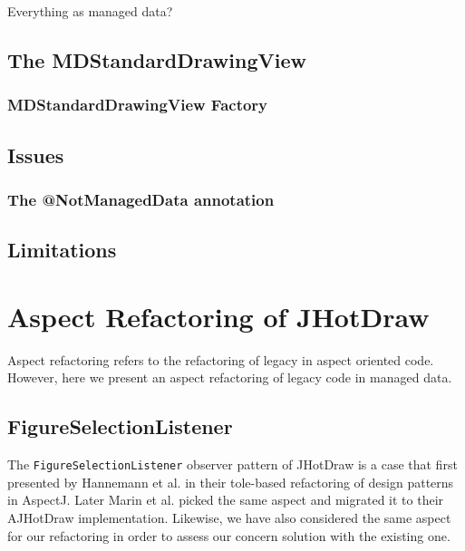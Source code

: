 Everything as managed data?

\subsection{The MDStandardDrawingView}

\subsubsection{MDStandardDrawingView Factory}

\subsection{Issues}
\subsubsection{The @NotManagedData annotation}

\subsection{Limitations}

\section{Aspect Refactoring of JHotDraw}
Aspect refactoring refers to the refactoring of legacy in aspect oriented code. 
However, here we present an aspect refactoring of legacy code in managed data.

\subsection{FigureSelectionListener}
The \texttt{FigureSelectionListener} observer pattern of JHotDraw is a case that first presented by Hannemann et al. \cite{hannemann2005role} in their tole-based refactoring of design patterns in AspectJ. 
Later Marin et al. picked the same aspect and migrated it to their AJHotDraw implementation.
Likewise, we have also considered the same aspect for our refactoring in order to assess our concern solution with the existing one.

